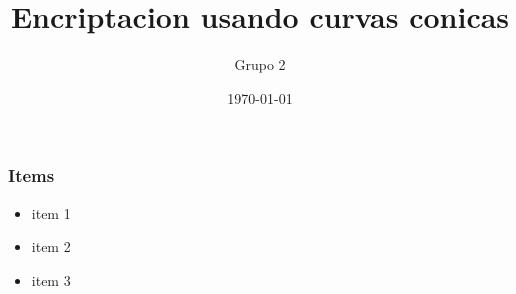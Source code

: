 \documentclass{beamer}
\title{Encriptacion usando curvas conicas}
\author{Grupo 2}
\date{\today}
\begin{document}
\maketitle

\begin{frame}

\frametitle{Items}
\begin{itemize}
\item item 1
\item item 2
\item item 3
\end{itemize}

\end{frame}
\end{document}
